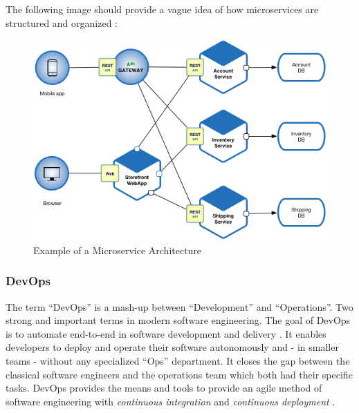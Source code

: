 The following image should provide a vague idea of how microservices are structured
and organized \cite{richardson:whatIsMSA}:

\begin{figure}[h]
    \centering
    \includegraphics[width=\columnwidth]{images/Microservice_Architecture.png}
    \caption{Example of a Microservice Architecture}
\end{figure}

\subsubsection{DevOps}

The term ``DevOps'' is a mash-up between ``Development'' and ``Operations''. Two
strong and important terms in modern software engineering. The goal of DevOps is to
automate end-to-end in software development and delivery \cite{ebert:DevOps}. It enables
developers to deploy and operate their software autonomously and - in smaller teams - without
any specialized ``Ops'' department. It closes the gap between the classical
software engineers and the operations team which both had their specific tasks. DevOps
provides the means and tools to provide an agile method of software engineering with
\textit{continuous integration} and \textit{continuous deployment} \cite{huettermann:DevOps}.
